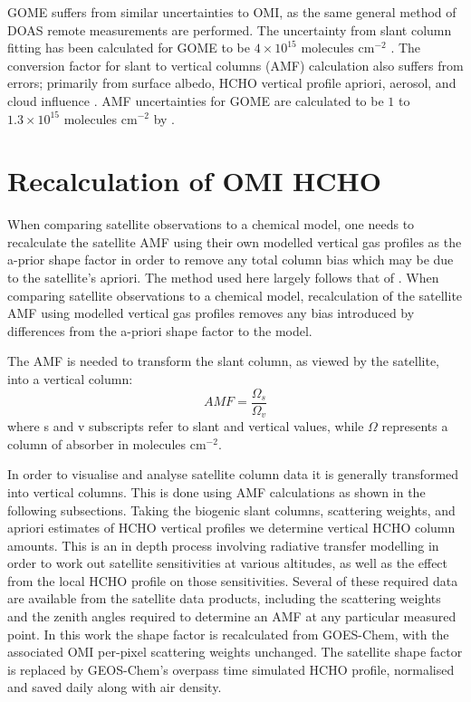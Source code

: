       GOME suffers from similar uncertainties to OMI, as the same general method of DOAS remote measurements are performed.
      The uncertainty from slant column fitting has been calculated for GOME to be $4\times10^{15}$ molecules cm$^{-2}$ \parencite{Chance2000, Millet2006}. 
      The conversion factor for slant to vertical columns (AMF) calculation also suffers from errors; primarily from surface albedo, HCHO vertical profile apriori, aerosol, and cloud influence \parencite{Millet2006}. 
      AMF uncertainties for GOME are calculated to be $1$ to $1.3\times10^{15}$ molecules cm$^{-2}$ by \textcite{Shim2005}.

\section{Recalculation of OMI HCHO}
  \label{Model:omiRecalc}
  
  When comparing satellite observations to a chemical model, one needs to recalculate the satellite AMF using their own modelled vertical gas profiles as the a-prior shape factor in order to remove any total column bias which may be due to the satellite's apriori.
  The method used here largely follows that of \textcite{Palmer2001}.
  When comparing satellite observations to a chemical model, recalculation of the satellite AMF using modelled vertical gas profiles removes any bias introduced by differences from the a-priori shape factor to the model.
  
  The AMF is needed to transform the slant column, as viewed by the satellite, into a vertical column:
  \begin{equation}
  \label{eqn:AMFratio}
  AMF = \frac{\Omega_s}{\Omega_v} %
  \end{equation}
  where s and v subscripts refer to slant and vertical values, while $\Omega$ represents a column of absorber in molecules cm$^{-2}$.
  
  
  In order to visualise and analyse satellite column data it is generally transformed into vertical columns. 
  This is done using AMF calculations as shown in the following subsections.
  Taking the biogenic slant columns, scattering weights, and apriori estimates of HCHO vertical profiles we determine vertical HCHO column amounts.
  This is an in depth process involving radiative transfer modelling in order to work out satellite sensitivities at various altitudes, as well as the effect from the local HCHO profile on those sensitivities.
  Several of these required data are available from the satellite data products, including the scattering weights and the zenith angles required to determine an AMF at any particular measured point.
  In this work the shape factor is recalculated from GOES-Chem, with the associated OMI per-pixel scattering weights unchanged. 
  The satellite shape factor is replaced by GEOS-Chem's overpass time simulated HCHO profile, normalised and saved daily along with air density.
  

